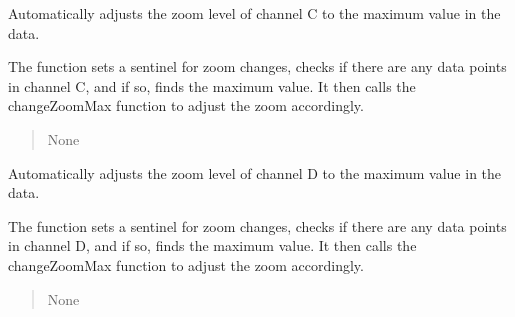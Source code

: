 \documentclass[letterpaper,10pt,english]{sphinxmanual}
\begin{document}
\begin{fulllineitems}
\begin{fulllineitems}
\end{fulllineitems}


\begin{fulllineitems}
\label{\detokenize{StartStopHist:StartStopHist.StartStopLogic.autoRangeC}}
\pysigstartsignatures
{}
\pysigstopsignatures
\sphinxAtStartPar
Automatically adjusts the zoom level of channel C to the maximum value in the data.

\sphinxAtStartPar
The function sets a sentinel for zoom changes, checks if there are any data points in 
channel C, and if so, finds the maximum value. It then calls the changeZoomMax function
to adjust the zoom accordingly.
\begin{quote}\begin{description}
\sphinxAtStartPar
None

\end{description}\end{quote}

\end{fulllineitems}


\begin{fulllineitems}
\label{\detokenize{StartStopHist:StartStopHist.StartStopLogic.autoRangeD}}
\pysigstartsignatures
{}
\pysigstopsignatures
\sphinxAtStartPar
Automatically adjusts the zoom level of channel D to the maximum value in the data.

\sphinxAtStartPar
The function sets a sentinel for zoom changes, checks if there are any data points in 
channel D, and if so, finds the maximum value. It then calls the changeZoomMax function
to adjust the zoom accordingly.
\begin{quote}\begin{description}
\sphinxAtStartPar
None

\end{description}\end{quote}

\end{fulllineitems}


\end{fulllineitems}
\end{document}
